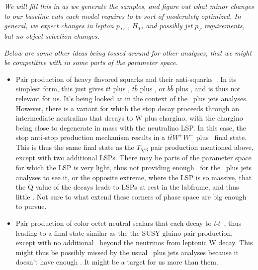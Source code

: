 {\it We will fill this in as we generate the samples, and figure out what minor changes to our baseline cuts each model
requires to be sort of moderately optimized. In general, we expect changes in lepton $p_T$, \met, $H_T$, and possibly
jet $p_T$ requirements, but no object selection changes.}

{\it Below are some other ideas being tossed around for other analyses, that we might be competitive with in
some parts of the parameter space.}

\begin{itemize}
\item Pair production of heavy flavored squarks and their anti-squarks~\cite{toro1}. In its simplest form, this just gives 
$t\bar{t}$ plus \met, $t\bar{b}$ plus \met, or $b\bar{b}$ plus \met, and is thus not relevant for us. It's being looked at
in the context of the \met\ plus jets analyses. 
However, there is a variant for which the stop decay proceeds through an intermediate neutralino that decays to W plus
chargino, with the chargino being close to degenerate in mass with the neutralino LSP. In this case,
the stop anti-stop production mechanism results in a $t\bar{t}W^+W^-$ plus \met\ final state. This is thus the same 
final state as the $T_{5/3}$ pair production mentioned above, except with two additional LSPs. 
There may be parts of the parameter space for which the LSP is very light, thus not providing enough \met\ for the 
\met\ plus jets analyses to see it, or the opposite extreme, where the LSP is so massive, that the Q value of the decays
leads to LSPs at rest in the labframe, and thus little \met . Not sure to what extend these corners of phase space are
big enough to pursue.
\item Pair production of color octet neutral scalars that each decay to $t\bar{}t$~\cite{toro2}, thus leading to a final state
similar as the the SUSY gluino pair production, except with no additional \met\ beyond the neutrinos from leptonic
W decay. This might thus be possibly missed by the usual \met\ plus jets analyses because it doesn't have enough \met .
It might be a target for us more than them.
\end{itemize}
